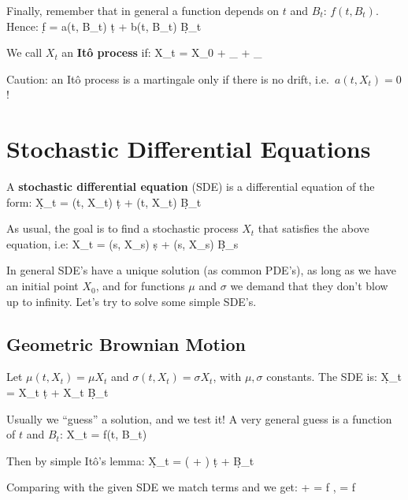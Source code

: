 Finally, remember that in general a function depends on $t$ and $B_{t}$: $f(t, B_{t})$. Hence:
\bse
\d f = a(t, B_{t}) \: \d t + b(t, B_{t}) \: \d B_{t}
\ese

\bd[It\^o Process]
We call $X_{t}$ an \textbf{It\^o process} if:
\bse
X_{t} = X_{0} + _{} +
_{}
\ese
\ed

Caution: an It\^o process is a martingale only if there is no drift, i.e.\ $a(t, X_{t}) = 0$!

\section{Stochastic Differential Equations}

A \textbf{stochastic differential equation} (SDE) is a differential equation of the form:
\bse
\d X_{t} = \mu(t, X_{t}) \: \d t + \sigma(t, X_{t}) \: \d B_{t}
\ese
\ed

As usual, the goal is to find a stochastic process $X_{t}$ that satisfies the above equation, i.e:
\bse
X_{t} = \int \mu(s, X_{s}) \: \d s + \int \sigma(s, X_{s}) \: \d B_{s}
\ese

In general SDE's have a unique solution (as common PDE's), as long as we have an initial point $X_{0}$, and for
functions $\mu$ and $\sigma$ we demand that they don't blow up to infinity. \v

Let's try to solve some simple SDE's.

\subsection{Geometric Brownian Motion}

Let $\mu(t, X_{t}) = \mu X_{t}$ and $\sigma(t, X_{t}) = \sigma X_{t}$, with $\mu, \sigma$ constants. The SDE is:
\bse
\d X_{t} = \mu X_{t} \: \d t + \sigma X_{t} \: \d B_{t}
\ese

Usually we ``guess'' a solution, and we test it! A very general guess is a function of $t$ and $B_{t}$:
\bse
X_{t} = f(t, B_{t})
\ese

Then by simple It\^o's lemma:
\bse
\d X_{t} = \Big(  +   \Big) \d t +
 \d B_{t}
\ese

Comparing with the given SDE we match terms and we get:
\bse
{} +   = \mu f \: , \qquad
{} = \sigma f
\ese

